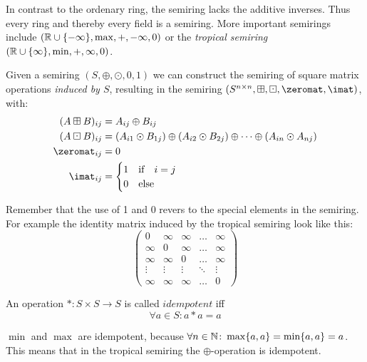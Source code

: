 In contrast to the ordenary ring, the semiring lacks the additive inverses. Thus every ring and thereby every field is a semiring. More important semirings include $(\mathbb{R} \cup \{-\infty\}, \max, +, -\infty, 0)$ or the \textit{tropical semiring} $(\mathbb{R} \cup \{\infty\}, \min, +, \infty, 0)$.

\begin{definition}
    Given a semiring $(S, \oplus, \odot, 0, 1)$ we can construct the semiring of square matrix operations \textit{induced by $S$}, resulting in the semiring $(S^{n \times n}, \boxplus, \boxdot, \zeromat, \imat)$, with:
\begin{align*}
    (A \boxplus B)_{ij} &= A_{ij} \oplus B_{ij}\\
    (A \boxdot B)_{ij} &= (A_{i1} \odot B_{1j}) \oplus (A_{i2} \odot B_{2j}) \oplus \dots \oplus (A_{in} \odot A_{nj})\\
    \zeromat_{ij} &= 0\\
    \imat_{ij} &= \begin{cases}
        1 &\textrm{if}\quad i = j\\
        0 &\textrm{else}
    \end{cases}
\end{align*}
\end{definition}

Remember that the use of 1 and 0 revers to the special elements in the semiring. For example the identity matrix induced by the tropical semiring look like this:
$$
\left(
\begin{matrix}
    0 & \infty & \infty & \dots & \infty\\
    \infty & 0 & \infty & \dots & \infty\\
    \infty & \infty & 0 & \dots & \infty\\
    \vdots & \vdots & \vdots & \ddots & \vdots\\
    \infty & \infty & \infty & \dots & 0
\end{matrix}
\right)
$$
\begin{definition}
    An operation $*\colon S \times S \to S$ is called $idempotent$ iff 
    $$\forall a \in S: a * a = a$$
\end{definition}
\begin{example}
    $\min$ and $\max$ are idempotent, because $\forall n \in \mathbb{N}\colon \max\{a, a\} = \min\{a, a\} = a$. This means that in the tropical semiring the $\oplus$-operation is idempotent.
\end{example}

